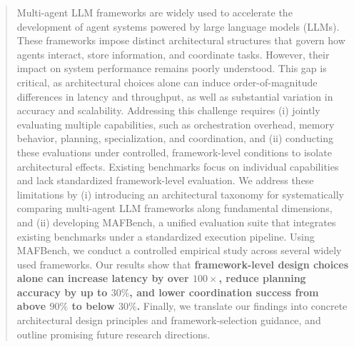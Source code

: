 
\begin{abstract}
Multi-agent LLM frameworks are widely used to accelerate the development of agent systems powered by large language models (LLMs). These frameworks impose distinct architectural structures that govern how agents interact, store information, and coordinate tasks. However, their impact on system performance remains poorly understood. This gap is critical, as architectural choices alone can induce order-of-magnitude differences in latency and throughput, as well as substantial variation in accuracy and scalability.
%
Addressing this challenge requires (i) jointly evaluating multiple capabilities, such as orchestration overhead, memory behavior, planning, specialization, and coordination, and (ii) conducting these evaluations under controlled, framework-level conditions to isolate architectural effects. Existing benchmarks focus on individual capabilities and lack standardized framework-level evaluation.
%
We address these limitations by (i) introducing an architectural taxonomy for systematically comparing multi-agent LLM frameworks along fundamental dimensions, and (ii) developing MAFBench, a unified evaluation suite that integrates existing benchmarks under a standardized execution pipeline. Using MAFBench, we conduct a controlled empirical study across several widely used frameworks. Our results show that \textbf{framework-level design choices alone can increase latency by over $100\times$, reduce planning accuracy by up to $30\%$, and lower coordination success from above $90\%$ to below $30\%$.} Finally, we translate our findings into concrete architectural design principles and framework-selection guidance, and outline promising future research directions.
\end{abstract}




